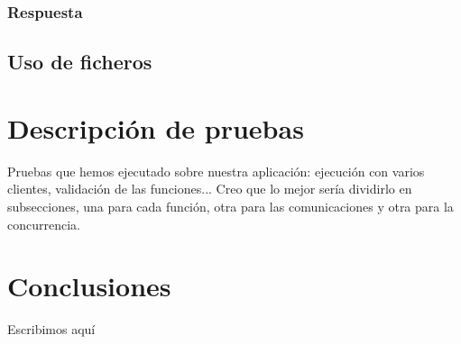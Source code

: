 \documentclass[]{article}
\begin{document}
\subsubsection*{Respuesta}
\label{subsec::respuesta}




\subsection{Uso de ficheros}
\label{subsec:uso_de_ficheros}



\section{Descripción de pruebas}
\label{sec:descripcion_de_pruebas}
Pruebas que hemos ejecutado sobre nuestra aplicación: ejecución con varios clientes, validación de las funciones... Creo que lo mejor sería dividirlo en subsecciones, una para cada función, otra para las comunicaciones y otra para la concurrencia. 



\section{Conclusiones}
\label{sec:conclusiones}
Escribimos aquí
\end{document}
